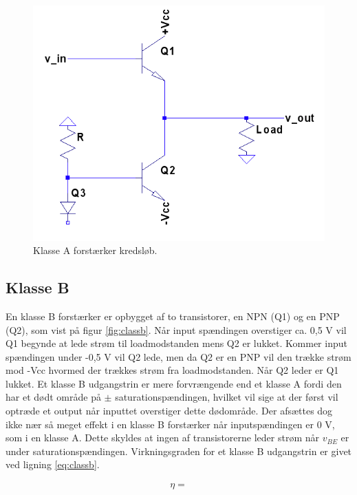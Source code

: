 \begin{figure}[h]
\centering
\includegraphics[scale=.35]{indledende_analyse/klasser/classa.png}
\caption{Klasse A forstærker kredsløb.}
\label{fig:classa}
\end{figure}


\subsection{Klasse B}
En klasse B forstærker er opbygget af to transistorer, en NPN (Q1) og en PNP (Q2), som vist på figur \ref{fig:classb}. Når input spændingen overstiger ca. 0,5 V vil Q1 begynde at lede strøm til loadmodstanden mens Q2 er lukket. Kommer input spændingen under -0,5 V vil Q2 lede, men da Q2 er en PNP vil den trække strøm mod -Vcc hvormed der trækkes strøm fra loadmodstanden. Når Q2 leder er Q1 lukket. 
Et klasse B udgangstrin er mere forvrængende end et klasse A fordi den har et dødt område på  $\pm$ saturationspændingen, hvilket vil sige at der først vil optræde et output når inputtet overstiger dette dødområde.  Der afsættes dog ikke nær så meget effekt i en klasse B forstærker når inputspændingen er 0 V, som i en klasse A. Dette skyldes at ingen af transistorerne leder strøm når $v_{BE} $ er under saturationspændingen. Virkningsgraden for et klasse B udgangstrin er givet ved ligning \ref{eq:classb}.

\begin{eqnarray}
\eta=  \label{eq:classb}
\end{eqnarray}

